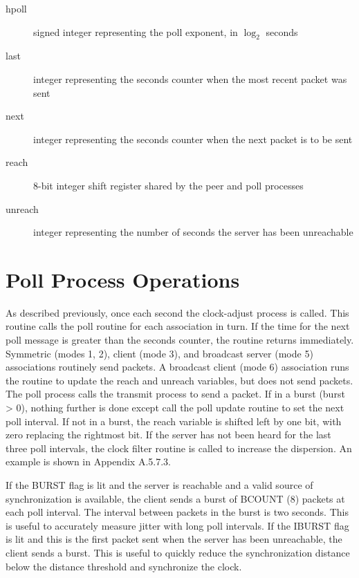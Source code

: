 \begin{description}

  \item[hpoll] signed integer representing the poll exponent, in $ \log_2 $ seconds

  \item[last] integer representing the seconds counter when the most recent
    packet was sent

  \item[next] integer representing the seconds counter when the next packet
    is to be sent

  \item[reach] 8-bit integer shift register shared by the peer and poll
    processes

  \item[unreach] integer representing the number of seconds the server has
    been unreachable

\end{description}

\section{Poll Process Operations}
\label{section-13-2}

As described previously, once each second the clock-adjust process is
called.  This routine calls the poll routine for each association in
turn.  If the time for the next poll message is greater than the
seconds counter, the routine returns immediately.  Symmetric (modes
1, 2), client (mode 3), and broadcast server (mode 5) associations
routinely send packets.  A broadcast client (mode 6) association runs
the routine to update the reach and unreach variables, but does not
send packets.  The poll process calls the transmit process to send a
packet.  If in a burst (burst > 0), nothing further is done except
call the poll update routine to set the next poll interval.
  If not in a burst, the reach variable is shifted left by one bit,
with zero replacing the rightmost bit.  If the server has not been
heard for the last three poll intervals, the clock filter routine is
called to increase the dispersion.  An example is shown in
Appendix A.5.7.3.

If the BURST flag is lit and the server is reachable and a valid
source of synchronization is available, the client sends a burst of
BCOUNT (8) packets at each poll interval.  The interval between
packets in the burst is two seconds.  This is useful to accurately
measure jitter with long poll intervals.  If the IBURST flag is lit
and this is the first packet sent when the server has been
unreachable, the client sends a burst.  This is useful to quickly
reduce the synchronization distance below the distance threshold and
synchronize the clock.

